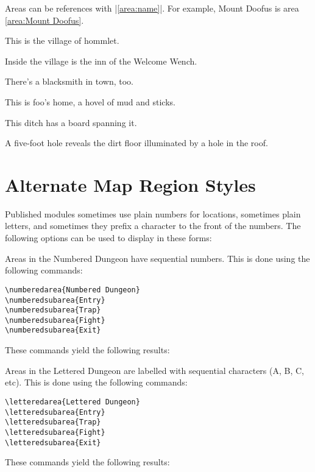 \documentclass[letterpaper,twocolumn,openany,nodeprecatedcode]{dndbook}
\begin{document}

Areas can be references with |\ref{area:name}|. For example, Mount Doofus is area \ref{area:Mount Doofus}.

This is the village of hommlet.

Inside the village is the inn of the Welcome Wench.

There's a blacksmith in town, too.

This is foo's home, a hovel of mud and sticks.

This ditch has a board spanning it.

A five-foot hole reveals the dirt floor illuminated by a hole in the roof.

\section{Alternate Map Region Styles}
Published modules sometimes use plain numbers for locations, sometimes plain
letters, and sometimes they prefix a character to the front of the numbers.
The following options can be used to display in these forms:

Areas in the Numbered Dungeon have sequential numbers. This is done using
the following commands:

\begin{verbatim}
\numberedarea{Numbered Dungeon}
\numberedsubarea{Entry}
\numberedsubarea{Trap}
\numberedsubarea{Fight}
\numberedsubarea{Exit}
\end{verbatim}

These commands yield the following results:

Areas in the Lettered Dungeon are labelled with sequential characters
(A, B, C, etc). This is done using the following commands:

\begin{verbatim}
\letteredarea{Lettered Dungeon}
\letteredsubarea{Entry}
\letteredsubarea{Trap}
\letteredsubarea{Fight}
\letteredsubarea{Exit}
\end{verbatim}

These commands yield the following results:
\end{document}
